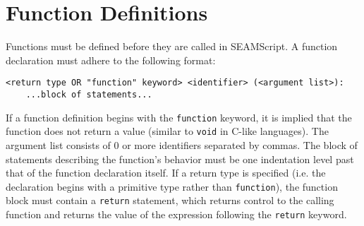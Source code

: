 \documentclass[titlepage]{article}
\begin{document}
\section{Function Definitions}
Functions must be defined before they are called in SEAMScript. A function declaration must adhere to the following format:

\begin{verbatim}
<return type OR "function" keyword> <identifier> (<argument list>):
    ...block of statements...
\end{verbatim}

If a function definition begins with the \verb|function| keyword, it is implied that the function does not return a value (similar to \verb|void| in C-like languages). The argument list consists of 0 or more identifiers separated by commas. The block of statements describing the function's behavior must be one indentation level past that of the function declaration itself. If a return type is specified (i.e. the declaration begins with a primitive type rather than \verb|function|), the function block must contain a \verb|return| statement, which returns control to the calling function and returns the value of the expression following the \verb|return| keyword.
\end{document}
